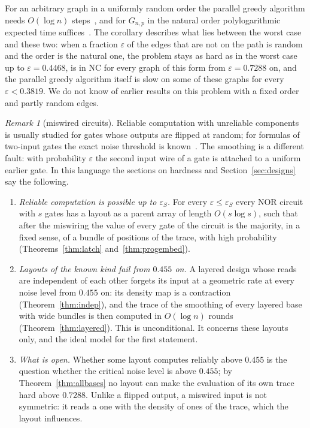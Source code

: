 \documentclass[11pt]{amsart}
\theoremstyle{definition}
\theoremstyle{remark}
\newtheorem{remark}[theorem]{Remark}
\newcommand{\eps}{\varepsilon}
\begin{document}
\noindent For an arbitrary graph in a uniformly random order the parallel greedy algorithm needs
$O(\log n)$ steps~\cite{nw-bfs12,nw-fn18}, and for $G_{n,p}$ in the natural order polylogarithmic
expected time suffices~\cite{nw-crt87,nw-cf90}. The corollary describes what lies between the
worst case and these two: when a fraction $\eps$ of the edges that are not on the path is random
and the order is the natural one, the problem stays as hard as in the worst case up to
$\eps=0.4468$, is in NC for every graph of this form from $\eps=0.7288$ on, and the parallel greedy
algorithm itself is slow on some of these graphs for every $\eps<0.3819$. We do not know of
earlier results on this problem with a fixed order and partly random edges.

\begin{remark}[miswired circuits]\label{rem:miswired}
Reliable computation with unreliable components~\cite{gb-vonneumann,gb-pippenger} is usually
studied for gates whose outputs are flipped at random; for formulas of two-input gates the exact
noise threshold is known~\cite{evansschulman,unger}. The smoothing is a different fault: with
probability $\eps$ the second input wire of a gate is attached to a uniform earlier gate. In this
language the sections on hardness and Section~\ref{sec:designs} say the following.
\begin{enumerate}[label=(\roman*),leftmargin=2.4em]
\item \emph{Reliable computation is possible up to $\eps_S$.} For every $\eps\le\eps_S$ every NOR
circuit with $s$ gates has a layout as a parent array of length $O(s\log s)$, such that after the miswiring the value of every gate of the
circuit is the majority, in a fixed sense, of a bundle of positions of the trace, with high
probability (Theorems~\ref{thm:latch} and~\ref{thm:progembed}).
\item \emph{Layouts of the known kind fail from $0.455$ on.} A layered design whose reads are
independent of each other forgets its input at a geometric rate at every noise level from
$0.455$ on: its density map is a contraction (Theorem~\ref{thm:indep}), and the trace of the
smoothing of every layered base with wide bundles is then computed in $O(\log n)$ rounds
(Theorem~\ref{thm:layered}). This is unconditional. It concerns these layouts only, and the
ideal model for the first statement.
\item \emph{What is open.} Whether some layout computes reliably above $0.455$ is the question
whether the critical noise level is above $0.455$; by Theorem~\ref{thm:allbases} no layout can
make the evaluation of its own trace hard above $0.7288$. Unlike a flipped output, a miswired
input is not symmetric: it reads a one with the density of ones of the trace, which the layout
influences.
\end{enumerate}
\end{remark}
\end{document}
